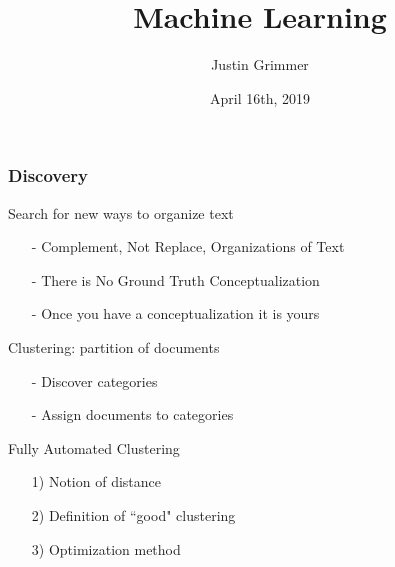 \documentclass{beamer}
\title[Machine Learning] %
{Machine Learning}
\author{Justin Grimmer}
\institute[Stanford University]{Professor\\Department of Political Science \\  Stanford University}
\date{April 16th, 2019}%
\numberwithin{equation}{section}
\begin{document}
\begin{frame}
\titlepage
\end{frame}


\begin{frame}
\frametitle{Discovery}

Search for new ways to organize text 

\begin{itemize}
\item[-] Complement, Not Replace, Organizations of Text
\item[-] There is No Ground Truth Conceptualization
\item[-] Once you have a conceptualization it is yours
\end{itemize}	


\end{frame}

\begin{frame}

Clustering: partition of documents
\begin{itemize}
	\item[-] Discover categories
	\item[-] Assign documents to categories 
\end{itemize}

\alert{Fully Automated Clustering}
\begin{itemize}
\item[1)] Notion of distance
\item[2)] Definition of ``good" clustering
\item[3)] Optimization method
\end{itemize}	



\end{frame}
\end{document}
